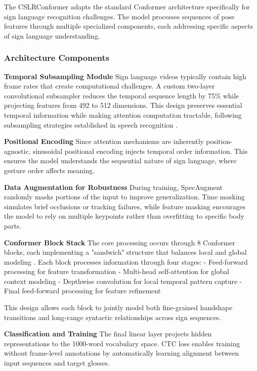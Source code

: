 The CSLRConformer adapts the standard Conformer architecture \cite{gulati2020conformer} specifically for sign language recognition challenges. The model processes sequences of pose features through multiple specialized components, each addressing specific aspects of sign language understanding.

\subsubsection{Architecture Components}

\textbf{Temporal Subsampling Module}
Sign language videos typically contain high frame rates that create computational challenges. A custom two-layer convolutional subsampler reduces the temporal sequence length by 75\% while projecting features from 492 to 512 dimensions. This design preserves essential temporal information while making attention computation tractable, following subsampling strategies established in speech recognition \cite{gulati2020conformer}.

\textbf{Positional Encoding}
Since attention mechanisms are inherently position-agnostic, sinusoidal positional encoding \cite{thoker2021skeleton} injects temporal order information. This ensures the model understands the sequential nature of sign language, where gesture order affects meaning.

\textbf{Data Augmentation for Robustness}
During training, SpecAugment \cite{park2019specaugment} randomly masks portions of the input to improve generalization. Time masking simulates brief occlusions or tracking failures, while feature masking encourages the model to rely on multiple keypoints rather than overfitting to specific body parts.

\textbf{Conformer Block Stack}
The core processing occurs through 8 Conformer blocks, each implementing a "sandwich" structure that balances local and global modeling \cite{gulati2020conformer}. Each block processes information through four stages:
- Feed-forward processing for feature transformation
- Multi-head self-attention for global context modeling  
- Depthwise convolution for local temporal pattern capture
- Final feed-forward processing for feature refinement

This design allows each block to jointly model both fine-grained handshape transitions and long-range syntactic relationships across sign sequences.

\textbf{Classification and Training}
The final linear layer projects hidden representations to the 1000-word vocabulary space. CTC loss \cite{graves2006connectionist} enables training without frame-level annotations by automatically learning alignment between input sequences and target glosses.


